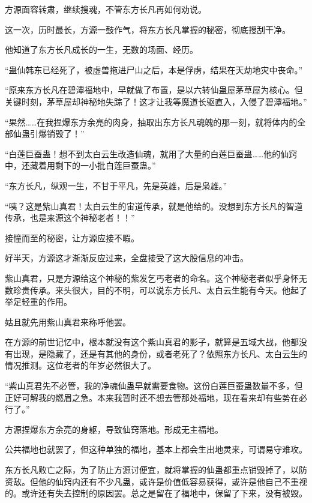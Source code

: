 
\begin{this_body}

方源面容转肃，继续搜魂，不管东方长凡再如何劝说。

这一次，历时最长，方源一鼓作气，将东方长凡掌握的秘密，彻底搜刮干净。

他知道了东方长凡成长的一生，无数的场面、经历。

“蛊仙韩东已经死了，被虚兽拖进尸山之后，本是俘虏，结果在天劫地灾中丧命。”

“原来东方长凡在碧潭福地中，早就做了布置，是以六转仙蛊屋茅草屋为核心。但关键时刻，茅草屋却神秘地失踪了！这才让我等魔道长驱直入，入侵了碧潭福地。”

“果然……在我捏爆东方余亮的肉身，抽取出东方长凡魂魄的那一刻，就将体内的全部仙蛊引爆销毁了！”

“白莲巨蚕蛊！想不到太白云生改造仙魂，就用了大量的白莲巨蚕蛊……他的仙窍中，还藏着用剩下的一小批白莲巨蚕蛊。”

“东方长凡，纵观一生，不甘于平凡，先是英雄，后是枭雄。”

“咦？这是紫山真君！太白云生的宙道传承，就是他给的。没想到东方长凡的智道传承，也是来源这个神秘老者！！”

接憧而至的秘密，让方源应接不暇。

好半天，方源这才渐渐反应过来，全盘接受了这大股信息的冲击。

紫山真君，只是方源给这个神秘的紫发乞丐老者的命名。这个神秘老者似乎身怀无数珍贵传承。来头很大，目的不明，可以说东方长凡、太白云生能有今天。他起了举足轻重的作用。

姑且就先用紫山真君来称呼他罢。

在方源的前世记忆中，根本就没有这个紫山真君的影子，就算是五域大战，他都没有出现，是隐藏了，还是有其他的身份，或者老死了？依照东方长凡、太白云生的情况推测。这位老者的年岁必然很大了。

“紫山真君先不必管，我的净魂仙蛊早就需要食物。这份白莲巨蚕蛊数量不多，但正好可解我的燃眉之急。本来我暂时还不想去管那处福地，现在看来却有些势在必行了。”

方源捏爆东方余亮的身躯，导致仙窍落地。形成无主福地。

公共福地也就罢了，但这种单独的福地，基本上都会生出地灵来，可谓易守难攻。

东方长凡败亡之际，为了防止方源讨便宜，就将掌握的仙蛊都重点销毁掉了，以防资敌。但他的仙窍内还有不少凡蛊，或许是价值低容易获得，或许是他自己不重视的。或许还有失去控制的原因罢。总之是留在了福地中，保留了下来，没有被毁。


\end{this_body}

